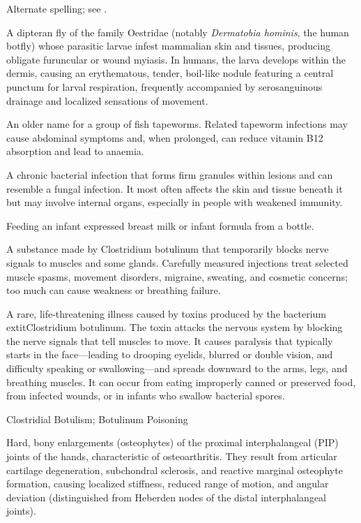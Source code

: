  Alternate spelling; see .

 A dipteran fly of the family Oestridae (notably \textit{Dermatobia hominis}, the human botfly) whose parasitic larvae infest mammalian skin and tissues, producing obligate furuncular or wound myiasis. In humans, the larva develops within the dermis, causing an erythematous, tender, boil-like nodule featuring a central punctum for larval respiration, frequently accompanied by serosanguinous drainage and localized sensations of movement.

 An older name for a group of fish tapeworms. Related tapeworm infections may cause abdominal symptoms and, when prolonged, can reduce vitamin B12 absorption and lead to anaemia.

 A chronic bacterial infection that forms firm granules within lesions and can resemble a fungal infection. It most often affects the skin and tissue beneath it but may involve internal organs, especially in people with weakened immunity.

 Feeding an infant expressed breast milk or infant formula from a bottle.

 A substance made by Clostridium botulinum that temporarily blocks nerve signals to muscles and some glands. Carefully measured injections treat selected muscle spasms, movement disorders, migraine, sweating, and cosmetic concerns; too much can cause weakness or breathing failure.

 A rare, life-threatening illness caused by toxins produced by the bacterium  extit{Clostridium botulinum}. The toxin attacks the nervous system by blocking the nerve signals that tell muscles to move. It causes paralysis that typically starts in the face---leading to drooping eyelids, blurred or double vision, and difficulty speaking or swallowing---and spreads downward to the arms, legs, and breathing muscles. It can occur from eating improperly canned or preserved food, from infected wounds, or in infants who swallow bacterial spores.

\synonyms
Clostridial Botulism; Botulinum Poisoning

 Hard, bony enlargements (osteophytes) of the proximal interphalangeal (PIP) joints of the hands, characteristic of osteoarthritis. They result from articular cartilage degeneration, subchondral sclerosis, and reactive marginal osteophyte formation, causing localized stiffness, reduced range of motion, and angular deviation (distinguished from Heberden nodes of the distal interphalangeal joints).

